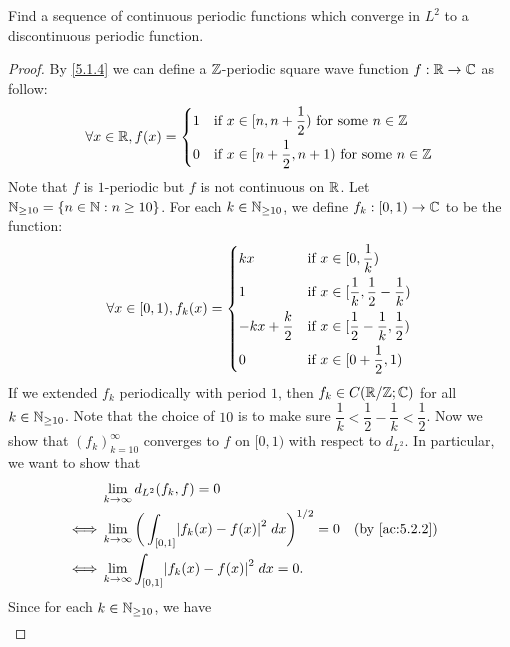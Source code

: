 \begin{ex}\label{ex:5.2.5}
  Find a sequence of continuous periodic functions which converge in \(L^2\) to a discontinuous periodic function.
\end{ex}

\begin{proof}
  By \cref{5.1.4} we can define a \(\mathbb{Z}\)-periodic square wave function \(f : \mathbb{R} \to \mathbb{C}\) as follow:
  \[
    \forall x \in \mathbb{R}, f(x) = \begin{dcases}
      1 & \text{if } x \in [n, n + \dfrac{1}{2}) \text{ for some } n \in \mathbb{Z}     \\
      0 & \text{if } x \in [n + \dfrac{1}{2}, n + 1) \text{ for some } n \in \mathbb{Z}
    \end{dcases}
  \]
  Note that \(f\) is \(1\)-periodic but \(f\) is not continuous on \(\mathbb{R}\).
  Let \(\mathbb{N}_{\geq 10} = \left\lbrace n \in \mathbb{N} : n \geq 10\right\rbrace\).
  For each \(k \in \mathbb{N}_{\geq 10}\), we define \(f_k : [0, 1) \to \mathbb{C}\) to be the function:
  \[
    \forall x \in [0, 1), f_k(x) = \begin{dcases}
      kx                 & \text{if } x \in [0, \dfrac{1}{k})                           \\
      1                  & \text{if } x \in [\dfrac{1}{k}, \dfrac{1}{2} - \dfrac{1}{k}) \\
      -kx + \dfrac{k}{2} & \text{if } x \in [\dfrac{1}{2} - \dfrac{1}{k}, \dfrac{1}{2}) \\
      0                  & \text{if } x \in [0 + \dfrac{1}{2}, 1)
    \end{dcases}
  \]
  If we extended \(f_k\) periodically with period \(1\), then \(f_k \in C(\mathbb{R} / \mathbb{Z} ; \mathbb{C})\) for all \(k \in \mathbb{N}_{\geq 10}\).
  Note that the choice of \(10\) is to make sure \(\dfrac{1}{k} < \dfrac{1}{2} - \dfrac{1}{k} < \dfrac{1}{2}\).
  Now we show that \((f_k)_{k = 10}^\infty\) converges to \(f\) on \([0, 1)\) with respect to \(d_{L^2}\).
  In particular, we want to show that
  \begin{align*}
         & \lim_{k \to \infty} d_{L^2}(f_k, f) = 0                                                                  \\
    \iff & \lim_{k \to \infty} \bigg(\int_{[0, 1]} \abs{f_k(x) - f(x)}^2 \; dx\bigg)^{1 / 2} = 0 &  & \by{ac:5.2.2} \\
    \iff & \lim_{k \to \infty} \int_{[0, 1]} \abs{f_k(x) - f(x)}^2 \; dx = 0.
  \end{align*}
  Since for each \(k \in \mathbb{N}_{\geq 10}\), we have
  \begin{align*}

\end{align*}
\end{proof}
